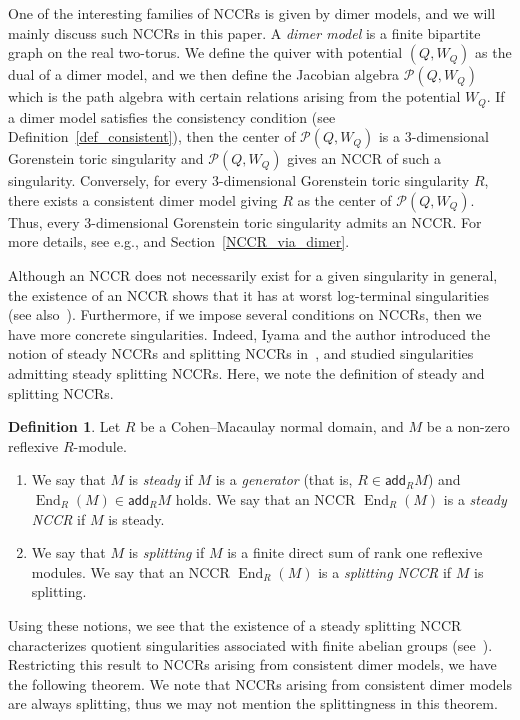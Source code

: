\documentclass[11pt]{amsart}
\theoremstyle{definition}
\newtheorem{defi}[theo]{Definition}
\newcommand{\calP}{\mathcal{P}}
\DeclareMathOperator{\End}{End}
\newcommand{\add}{\mathsf{add}}
\begin{document}

One of the interesting families of NCCRs is given by dimer models, and we will mainly discuss such NCCRs in this paper. A \emph{dimer model} is a finite bipartite graph on the real two-torus. We define the quiver with potential $(Q, W_Q)$ as the dual of a dimer model, and we then define the Jacobian algebra $\calP(Q, W_Q)$ which is the path algebra with certain relations arising from the potential $W_Q$. If a dimer model satisfies the consistency condition (see Definition~\ref{def_consistent}), then the center of $\calP(Q, W_Q)$ is a $3$-dimensional Gorenstein toric singularity and $\calP(Q, W_Q)$ gives an NCCR of such a singularity. Conversely, for every $3$-dimensional Gorenstein toric singularity $R$, there exists a consistent dimer model giving $R$ as the center of $\calP(Q, W_Q)$. Thus, every $3$-dimensional Gorenstein toric singularity admits an NCCR. For more details, see e.g., \cite{Boc4,Bro,IU2} and Section~\ref{NCCR_via_dimer}.

Although an NCCR does not necessarily exist for a given singularity in general, the existence of an NCCR shows that it has at worst log-terminal singularities~\cite{DITW} (see also~\cite{DITV,StVdB}). Furthermore, if we impose several conditions on NCCRs, then we have more concrete singularities. Indeed, Iyama and the author introduced the notion of steady NCCRs and splitting NCCRs in~\cite{IN}, and studied singularities admitting steady splitting NCCRs. Here, we note the definition of steady and splitting NCCRs.

\begin{defi}\label{def_steady}
Let $R$ be a Cohen--Macaulay normal domain, and $M$ be a non-zero reflexive $R$-module.
\begin{enumerate}%
\item We say that $M$ is \emph{steady} if $M$ is a \emph{generator} (that is, $R\in\add_RM$) and $\End_R(M)\in\add_RM$ holds. We say that an NCCR $\End_R(M)$ is a \emph{steady NCCR} if $M$ is steady.
\item We say that $M$ is \emph{splitting} if $M$ is a finite direct sum of rank one reflexive modules. We say that an NCCR $\End_R(M)$ is a \emph{splitting NCCR} if $M$ is splitting.
\end{enumerate}
\end{defi}

Using these notions, we see that the existence of a steady splitting NCCR characterizes quotient singularities associated with finite abelian groups (see~\cite[Theorem~3.1]{IN}). Restricting this result to NCCRs arising from consistent dimer models, we have the following theorem. We note that NCCRs arising from consistent dimer models are always splitting, thus we may not mention the splittingness in this theorem.
\end{document}
